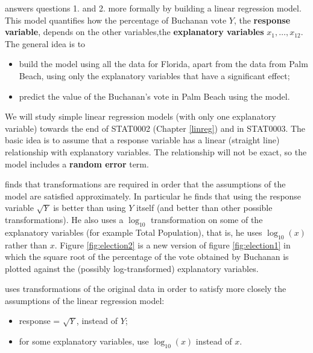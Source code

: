 \documentclass[
  11pt,
  british,
  openany, a4paper]{book}
\providecommand{\tightlist}{%
  \setlength{\itemsep}{0pt}\setlength{\parskip}{0pt}}
\begin{document}
\citet{election} answers questions 1. and 2. more formally by building a linear regression model. This model quantifies how the percentage of Buchanan vote \(Y\), the \textbf{response variable}, depends on the other variables,the \textbf{explanatory variables} \(x_1,\ldots,x_{12}\). The general idea is to

\begin{itemize}
\tightlist
\item
  build the model using all the data for Florida, apart from the data from Palm Beach, using only the explanatory variables that have a significant effect;
\item
  predict the value of the Buchanan's vote in Palm Beach using the model.
\end{itemize}

We will study simple linear regression models (with only one explanatory variable) towards the end of STAT0002 (Chapter \ref{linreg}) and in STAT0003. The basic idea is to assume that a response variable has a linear (straight line) relationship with explanatory variables. The relationship will not be exact, so the model includes a \textbf{random error} term.

\citet{election} finds that transformations are required in order that the assumptions of the model are satisfied approximately. In particular he finds that using the response variable \(\sqrt{Y}\) is better than using \(Y\) itself (and better than other possible transformations). He also uses a \(\log_{10}\) transformation on some of the explanatory variables (for example Total Population), that is, he uses \(\log_{10}(x)\) rather than \(x\). Figure \ref{fig:election2} is a new version of figure \ref{fig:election1} in which the square root of the percentage of the vote obtained by Buchanan is plotted against the (possibly log-transformed) explanatory variables.

\citet{election} uses transformations of the original data in order to satisfy more closely the assumptions of the linear regression model:

\begin{itemize}
\tightlist
\item
  response = \(\sqrt{Y}\), instead of \(Y\);
\item
  for some explanatory variables, use \(\log_{10}(x)\) instead of \(x\).
\end{itemize}
\end{document}
